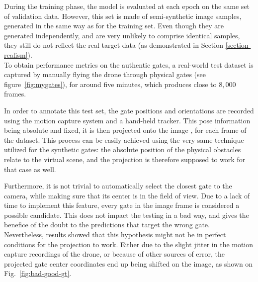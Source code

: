 During the training phase, the model is evaluated at each epoch on the same set
of validation data. However, this set is made of semi-synthetic image samples,
generated in the same way as for the training set. Even though they are
generated independently, and are very unlikely to comprise identical samples,
they still do not reflect the real target data (as demonstrated in Section
\ref{section-realism}).\\


To obtain performance metrics on the authentic gates, a real-world test dataset
is captured by manually flying the drone through physical gates (see
figure~\ref{fig:mygates}), for around five minutes, which produces close to
$8,000$ frames.

In order to annotate this test set, the gate positions and orientations are
recorded using the motion capture system and a hand-held tracker. This pose
information being absolute and fixed, it is then projected onto the image
, for each frame of the dataset. This process can be easily achieved using the
very same technique utilized for the synthetic gates: the absolute position of
the physical obstacles relate to the virtual scene, and the projection is
therefore supposed to work for that case as well.

Furthermore, it is not trivial to automatically select the closest gate to the
camera, while making sure that its center is in the field of view. Due to a
lack of time to implement this feature, every gate in the image frame is
considered a possible candidate. This does not impact the testing in a bad way,
and gives the benefice of the doubt to the predictions that target the wrong
gate.\\

Nevertheless, results showed that this hypothesis might not be in perfect
conditions for the projection to work. Either due to the slight jitter in the
motion capture recordings of the drone, or because of other sources of error,
the projected gate center coordinates end up being shifted on the image, as
shown on Fig.~\ref{fig:bad-good-gt}.

